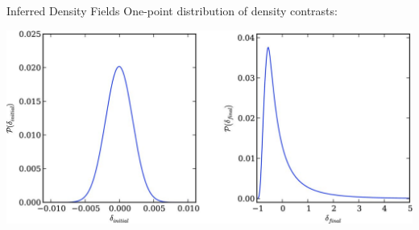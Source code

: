 \documentclass[10pt]{beamer}
\begin{document}
\begin{frame}[fragile]{Inferred Density Fields}
One-point distribution of density contrasts:

 
\begin{center}
            \includegraphics[width=1\textwidth]{stt449fig7.jpeg}

\end{center}
  
\end{frame}
\end{document}
